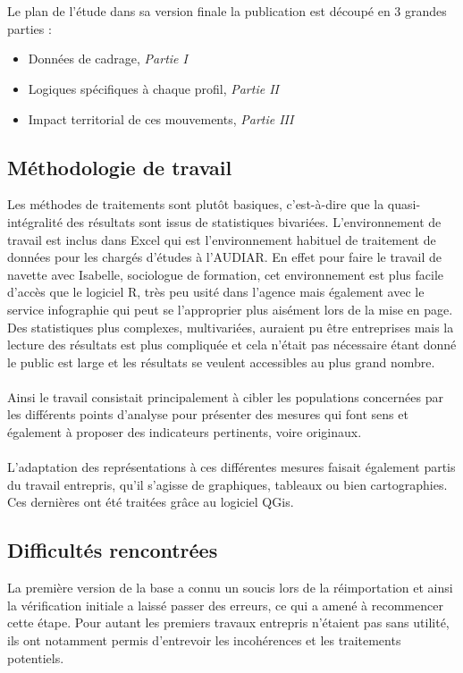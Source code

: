 \documentclass{bredele}
\begin{document}
\\\\Le plan de l'étude dans sa version finale la publication est découpé en 3 grandes parties :
\begin{itemize}
\newpage
	\item Données de cadrage,		\textit{Partie I}
	\item Logiques spécifiques à chaque profil,		\textit{Partie II}
	\item Impact territorial de ces mouvements,		\textit{Partie III}
\end{itemize}
\subsection{Méthodologie de travail}
Les méthodes de traitements sont plutôt basiques, c'est-à-dire que la quasi-intégralité des résultats sont issus de statistiques bivariées. L’environnement de travail est inclus dans Excel qui est l’environnement habituel de traitement de données pour les chargés d’études à l’AUDIAR. En effet pour faire le travail de navette avec Isabelle, sociologue de formation, cet environnement est plus facile d’accès que le logiciel R, très peu usité dans l’agence mais également avec le service infographie qui peut se l’approprier plus aisément lors de la mise en page. Des statistiques plus complexes, multivariées, auraient pu être entreprises mais la lecture des résultats est plus compliquée et cela n’était pas nécessaire étant donné le public est large et les résultats se veulent accessibles au plus grand nombre.
\\\\Ainsi le travail consistait principalement à cibler les populations concernées par les différents points d’analyse pour présenter des mesures qui font sens et également à proposer des indicateurs pertinents, voire originaux.
\\\\L’adaptation des représentations à ces différentes mesures faisait également partis du travail entrepris, qu’il s’agisse de graphiques, tableaux ou bien cartographies. Ces dernières ont été traitées grâce au logiciel QGis.
\subsection{Difficultés rencontrées}
La première version de la base a connu un soucis lors de la réimportation et ainsi la vérification initiale a laissé passer des erreurs, ce qui a amené à recommencer cette étape. Pour autant les premiers travaux entrepris n’étaient pas sans utilité, ils ont notamment permis d’entrevoir les incohérences et les traitements potentiels.
\end{document}
